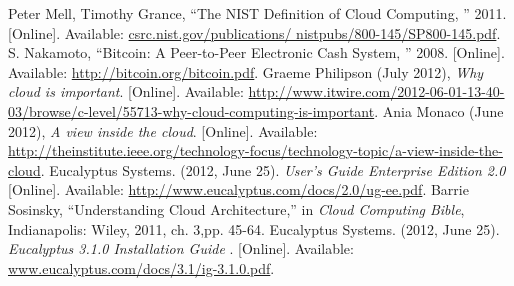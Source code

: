 \documentclass[a4page,12pt]{article}
\begin{document}
\begin{thebibliography}{xx}
Peter Mell, Timothy Grance, ``The NIST Definition of Cloud Computing, '' 2011. [Online]. Available: \url{csrc.nist.gov/publications/ nistpubs/800-145/SP800-145.pdf}.
S. Nakamoto, ``Bitcoin: A Peer-to-Peer Electronic Cash System, '' 2008. [Online]. Available: \url{http://bitcoin.org/bitcoin.pdf}. 
Graeme Philipson (July 2012), \textit{Why cloud is important}. [Online]. Available: \url{http://www.itwire.com/2012-06-01-13-40-03/browse/c-level/55713-why-cloud-computing-is-important}.
Ania  Monaco (June 2012), \textit{A view inside the cloud}. [Online]. Available: 
\url{http://theinstitute.ieee.org/technology-focus/technology-topic/a-view-inside-the-cloud}.
Eucalyptus Systems. (2012, June 25). \textit{User's Guide Enterprise Edition 2.0}
[Online]. Available: \url{http://www.eucalyptus.com/docs/2.0/ug-ee.pdf}.
Barrie Sosinsky, ``Understanding Cloud Architecture,'' in \textit{Cloud Computing Bible}, Indianapolis: Wiley, 2011, ch. 3,pp. 45-64.
Eucalyptus Systems. (2012, June 25). \textit{Eucalyptus 3.1.0 Installation Guide} . [Online]. Available:
\url{www.eucalyptus.com/docs/3.1/ig-3.1.0.pdf}.
\end{thebibliography}
\end{document}
